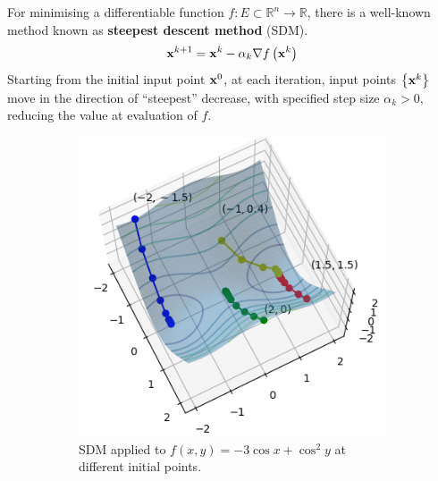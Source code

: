 \documentclass[../dissertation.tex]{subfiles}
\begin{document}
For minimising a differentiable function $f:E \subset \mathbb{R}^n \rightarrow \mathbb{R}$, there is a well-known method known as \textbf{steepest descent method} (SDM)\cite{doi:10.1137/1.9781611974997.ch8}.
\begin{equation}
    \mathbf{x}^{k+1} = \mathbf{x}^{k} - \alpha_k \nabla f \left( \mathbf{x}^{k} \right)
    \label{equ: SDM}
\end{equation}
Starting from the initial input point $\mathbf{x}^{0}$, at each iteration, input points $\left\{ \mathbf{x}^{k} \right\}$ move in the direction of ``steepest'' decrease,
with specified step size $\alpha_k > 0$,
reducing the value at evaluation of $f$.
\begin{figure}[tbp]
    \centering
    \begin{subfigure}[b]{0.4\textwidth}
        \includegraphics[width=\textwidth]{sections/gradientFlowImgs/sdm}
        \caption{SDM applied to $f(x,y) = -3 \cos x + \cos^2 y$ at different initial points.}
        \label{fig: SDM}
    \end{subfigure}
    \hspace{1cm}
    \begin{subfigure}[b]{0.4\textwidth}

\end{subfigure}
\end{figure}
\end{document}

